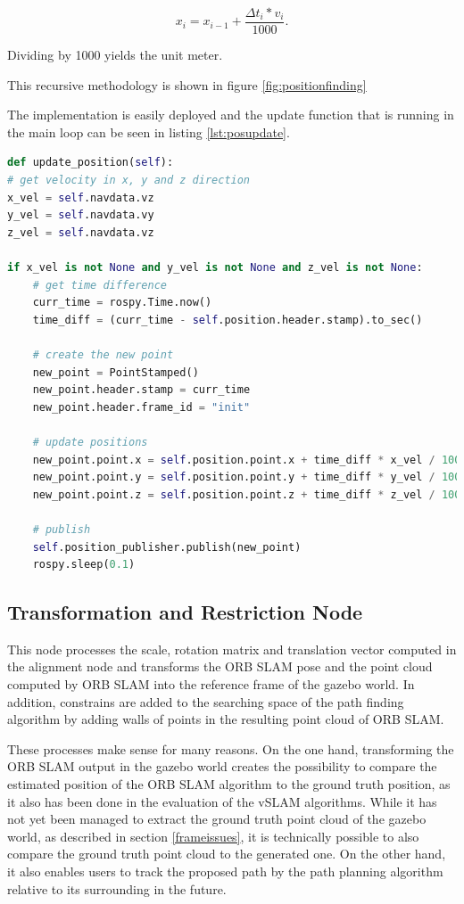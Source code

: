 	$$x_{i} = x_{i-1} + \frac{\Delta t_i * v_i}{1000}. $$ 
	
	Dividing by 1000 yields the unit meter. 
	
	This recursive methodology is shown in figure \ref{fig:positionfinding}
	
	
	The implementation is easily deployed and the update function that is running in the main loop can be seen in listing \ref{lst:posupdate}. 
	
	\begin{lstlisting}[language=python, caption=Main part of the position estimation node, label=lst:posupdate]
	def update_position(self):
# get velocity in x, y and z direction
x_vel = self.navdata.vz
y_vel = self.navdata.vy
z_vel = self.navdata.vz

if x_vel is not None and y_vel is not None and z_vel is not None:
	# get time difference
	curr_time = rospy.Time.now()
	time_diff = (curr_time - self.position.header.stamp).to_sec()
	
	# create the new point
	new_point = PointStamped()
	new_point.header.stamp = curr_time
	new_point.header.frame_id = "init"
	
	# update positions
	new_point.point.x = self.position.point.x + time_diff * x_vel / 1000
	new_point.point.y = self.position.point.y + time_diff * y_vel / 1000
	new_point.point.z = self.position.point.z + time_diff * z_vel / 1000
	
	# publish
	self.position_publisher.publish(new_point)
	rospy.sleep(0.1)
	\end{lstlisting}
	
	
	\subsection{Transformation and Restriction Node}
	
	This node processes the scale, rotation matrix and translation vector computed in the alignment node and transforms the ORB SLAM pose and the point cloud computed 
	by ORB SLAM into the reference frame of the gazebo world. In addition, constrains are added to the searching space of the path finding algorithm by adding 
	walls of points in the resulting point cloud of ORB SLAM. 
	
	These processes make sense for many reasons. On the one hand, transforming the ORB SLAM output in the gazebo world creates the possibility to compare the 
	estimated position of the ORB SLAM algorithm to the ground truth position, as it also has been done in the evaluation of the vSLAM algorithms. While it has not yet been managed to extract the ground truth point cloud of the gazebo world, as described in section \ref{frameissues}, it is technically possible to also 
	compare the ground truth point cloud to the generated one. On the other hand, it also enables users to track the proposed path by the path planning algorithm relative
	to its surrounding in the future. 
	
